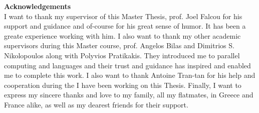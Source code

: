 \thispagestyle{empty}
\begin{titlepage}
{\bf\Large Acknowledgements}\\
I want to thank my supervisor of this Master Thesis, prof. Joel Falcou for his support and guidance and of-course
for his great sense of humor. It has been a greate experience working with him. I also want to thank my 
other academic supervisors during this Master course, prof. Angelos Bilas and Dimitrios S. Nikolopoulos along with 
Polyvios Pratikakis. They introduced me to parallel computing and languages and their trust and guidance has
inspired and enabled me to complete this work. I also want to thank Antoine Tran-tan for his help and cooperation during the
I have been working on this Thesis. Finally, I want to express my sincere thanks and love to my family, all my
flatmates, in Greece and France alike, as well as my dearest friends for their support. 

\vfill
\end{titlepage}
